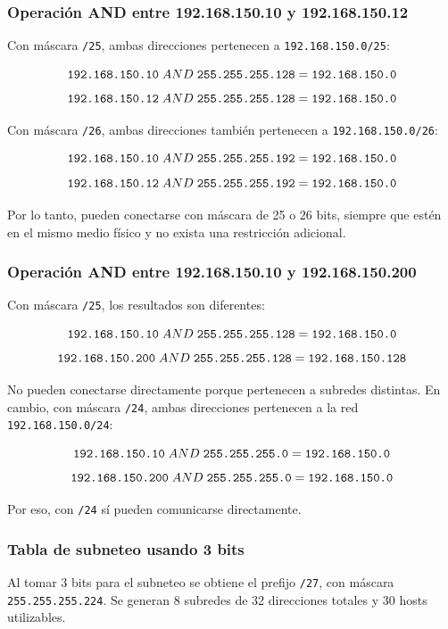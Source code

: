 \documentclass[a4paper,12pt]{article}
\newcommand{\ip}[1]{\mbox{\texttt{#1}}}
\begin{document}


\subsubsection{Operación AND entre 192.168.150.10 y 192.168.150.12}

Con máscara \ip{/25}, ambas direcciones pertenecen a \ip{192.168.150.0/25}:

\[
\ip{192.168.150.10} \; AND \; \ip{255.255.255.128} = \ip{192.168.150.0}
\]
\[
\ip{192.168.150.12} \; AND \; \ip{255.255.255.128} = \ip{192.168.150.0}
\]

Con máscara \ip{/26}, ambas direcciones también pertenecen a \ip{192.168.150.0/26}:

\[
\ip{192.168.150.10} \; AND \; \ip{255.255.255.192} = \ip{192.168.150.0}
\]
\[
\ip{192.168.150.12} \; AND \; \ip{255.255.255.192} = \ip{192.168.150.0}
\]

Por lo tanto, pueden conectarse con máscara de 25 o 26 bits, siempre que estén en el mismo medio físico y no exista una restricción adicional.

\subsubsection{Operación AND entre 192.168.150.10 y 192.168.150.200}

Con máscara \ip{/25}, los resultados son diferentes:

\[
\ip{192.168.150.10} \; AND \; \ip{255.255.255.128} = \ip{192.168.150.0}
\]
\[
\ip{192.168.150.200} \; AND \; \ip{255.255.255.128} = \ip{192.168.150.128}
\]

No pueden conectarse directamente porque pertenecen a subredes distintas. En cambio, con máscara \ip{/24}, ambas direcciones pertenecen a la red \ip{192.168.150.0/24}:

\[
\ip{192.168.150.10} \; AND \; \ip{255.255.255.0} = \ip{192.168.150.0}
\]
\[
\ip{192.168.150.200} \; AND \; \ip{255.255.255.0} = \ip{192.168.150.0}
\]

Por eso, con \ip{/24} sí pueden comunicarse directamente.

\subsubsection{Tabla de subneteo usando 3 bits}

Al tomar 3 bits para el subneteo se obtiene el prefijo \ip{/27}, con máscara \ip{255.255.255.224}. Se generan 8 subredes de 32 direcciones totales y 30 hosts utilizables.
\end{document}
